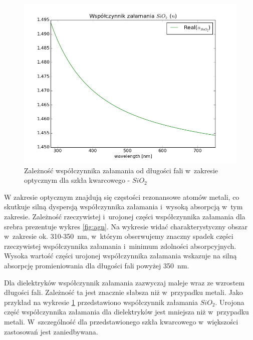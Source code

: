 \begin{figure}[tb]
	\includegraphics[width=\textwidth]{images/sio2n.png}
	\caption{Zależność współczynnika załamania od długości fali w~zakresie optycznym dla szkła kwarcowego -  $SiO_2$ \cite{MALITSON:65}   }
	\label{fig:sio2n}
\end{figure}
W zakresie optycznym znajdują się częstości rezonansowe atomów metali, co skutkuje silną dyspersją współczynnika załamania i~wysoką absorpcją w~tym zakresie. Zależność rzeczywistej i~urojonej części współczynnika załamania  dla srebra prezentuje wykres \ref{fig:agn}. Na wykresie widać charakterystyczny obszar w~zakresie ok. 310-350~nm, w~którym obserwujemy znaczny spadek części rzeczywistej współczynnika załamania i~minimum zdolności absorpcyjnych. Wysoka wartość części urojonej współczynnika załamania wskazuje na silną absorpcję promieniowania dla długości fali powyżej 350~nm.

Dla dielektryków współczynnik załamania zazwyczaj maleje wraz ze wzrostem długości fali. Zależność ta jest znacznie słabsza niż w~przypadku metali. Jako przykład na wykresie \ref{fig:sio2n} przedstawiono współczynnik załamania $SiO_2$. Urojona część współczynnika załamania dla dielektryków jest mniejsza niż w~przypadku metali. W~szczególność dla przedstawionego szkła kwarcowego w~większości zastosowań jest zaniedbywana.

